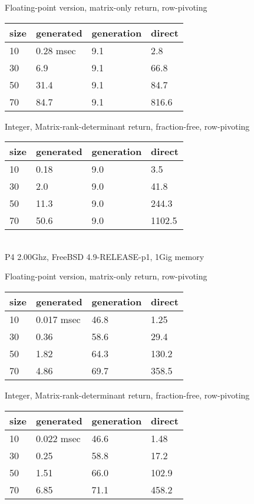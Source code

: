\documentclass[landscape]{slides}
\begin{document}
\begin{slide}
Floating-point version, matrix-only return, row-pivoting

\begin{tabular}{l|l|l|l}
	size & generated & generation & direct \\ \hline
	10 & 0.28 msec & 9.1 & 2.8 \\
	30 & 6.9  & 9.1 & 66.8 \\
	50 & 31.4 & 9.1 & 84.7 \\
	70 & 84.7 & 9.1 & 816.6 \\
\end{tabular}

Integer, Matrix-rank-determinant return, fraction-free, row-pivoting 

\begin{tabular}{l|l|l|l}
	size & generated & generation & direct \\ \hline
	10 & 0.18 & 9.0 & 3.5 \\
	30 & 2.0  & 9.0 & 41.8 \\
	50 & 11.3 & 9.0 & 244.3 \\
	70 & 50.6 & 9.0 & 1102.5 \\
\end{tabular}\\
P4 2.00Ghz, FreeBSD 4.9-RELEASE-p1, 1Gig memory
\end{slide}

\begin{slide}
Floating-point version, matrix-only return, row-pivoting

\begin{tabular}{l|l|l|l}
	size & generated & generation & direct \\ \hline
	10 & 0.017 msec & 46.8 & 1.25 \\
	30 & 0.36       & 58.6 & 29.4 \\
	50 & 1.82       & 64.3 & 130.2 \\
	70 & 4.86       & 69.7 & 358.5 \\
\end{tabular}

Integer, Matrix-rank-determinant return, fraction-free, row-pivoting 

\begin{tabular}{l|l|l|l}
	size & generated & generation & direct \\ \hline
	10 & 0.022 msec & 46.6 & 1.48 \\
	30 & 0.25       & 58.8 & 17.2 \\
	50 & 1.51       & 66.0 & 102.9 \\
	70 & 6.85       & 71.1 & 458.2 \\
\end{tabular}
\end{slide}
\end{document}
